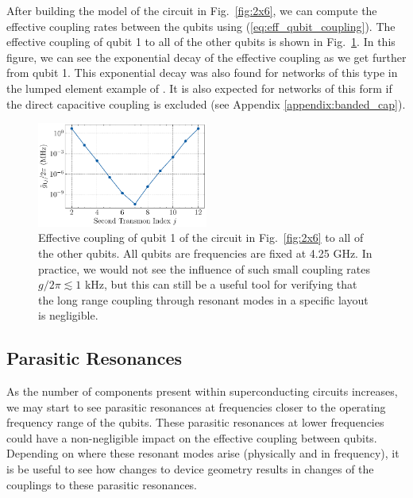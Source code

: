 After building the model of the circuit in Fig.\ \ref{fig:2x6}, we can compute the effective coupling rates between the qubits using (\ref{eq:eff_qubit_coupling}). The effective coupling of qubit 1 to all of the other qubits is shown in Fig.\ \ref{fig:2x6_coupling}. In this figure, we can see the exponential decay of the effective coupling as we get further from qubit 1. This exponential decay was also found for networks of this type in the lumped element example of \cite{solgun_sirf}. It is also expected for networks of this form if the direct capacitive coupling is excluded (see Appendix \ref{appendix:banded_cap}).

\begin{figure}[h!]
    \centering
    \includegraphics[width=0.5\textwidth]{figures/2x6_coupling.pdf}
    \caption{Effective coupling of qubit 1 of the circuit in Fig.\ \ref{fig:2x6} to all of the other qubits. All qubits are frequencies are fixed at 4.25 GHz. In practice, we would not see the influence of such small coupling rates $g/2\pi \lesssim 1$ kHz, but this can still be a useful tool for verifying that the long range coupling through resonant modes in a specific layout is negligible.}
    \label{fig:2x6_coupling}
\end{figure}

\subsection{Parasitic Resonances}
As the number of components present within superconducting circuits increases, we may start to see parasitic resonances at frequencies closer to the operating frequency range of the qubits. These parasitic resonances at lower frequencies could have a non-negligible impact on the effective coupling between qubits. Depending on where these resonant modes arise (physically and in frequency), it is be useful to see how changes to device geometry results in changes of the couplings to these parasitic resonances.

